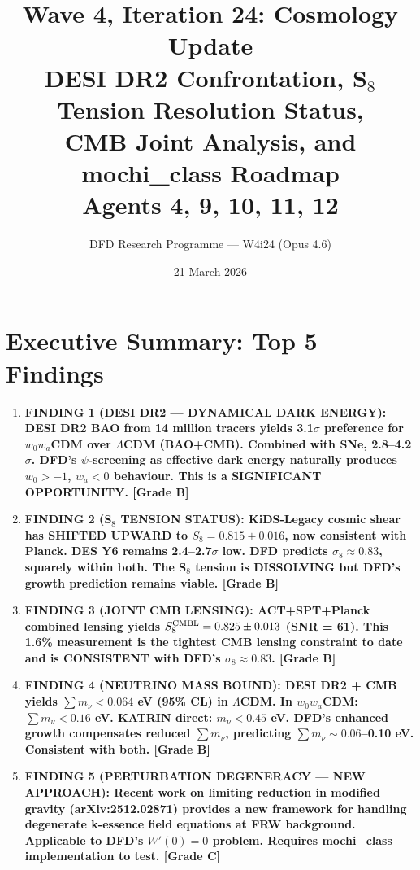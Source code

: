 \documentclass[11pt]{article}
\title{\textbf{Wave 4, Iteration 24: Cosmology Update}\\[12pt]
{\large DESI DR2 Confrontation, S$_8$ Tension Resolution Status,\\
CMB Joint Analysis, and mochi\_class Roadmap}\\[4pt]
{\large Agents 4, 9, 10, 11, 12}}
\author{DFD Research Programme --- W4i24 (Opus 4.6)}
\date{21 March 2026}
\newcommand{\LCDM}{$\Lambda$CDM}
\begin{document}
\maketitle
\tableofcontents
\newpage

\section*{Executive Summary: Top 5 Findings}

\begin{tcolorbox}[colback=blue!5!white, colframe=blue!70!black,
  title=\textbf{W4i24 TOP 5 FINDINGS --- COSMOLOGY TEAM}]

\begin{enumerate}

\item \textbf{FINDING 1 (DESI DR2 --- DYNAMICAL DARK ENERGY):
  DESI DR2 BAO from 14 million tracers yields 3.1$\sigma$ preference
  for $w_0w_a$CDM over \LCDM{} (BAO+CMB). Combined with SNe,
  2.8--4.2$\sigma$. DFD's $\psi$-screening as effective dark energy
  naturally produces $w_0 > -1$, $w_a < 0$ behaviour.
  This is a SIGNIFICANT OPPORTUNITY. [Grade B]}

\item \textbf{FINDING 2 (S$_8$ TENSION STATUS):
  KiDS-Legacy cosmic shear has SHIFTED UPWARD to $S_8 = 0.815 \pm 0.016$,
  now consistent with Planck. DES Y6 remains 2.4--2.7$\sigma$ low.
  DFD predicts $\sigma_8 \approx 0.83$, squarely within both.
  The S$_8$ tension is DISSOLVING but DFD's growth prediction remains
  viable. [Grade B]}

\item \textbf{FINDING 3 (JOINT CMB LENSING):
  ACT+SPT+Planck combined lensing yields $S_8^{\rm CMBL} = 0.825 \pm 0.013$
  (SNR = 61). This 1.6\% measurement is the tightest CMB lensing
  constraint to date and is CONSISTENT with DFD's $\sigma_8 \approx 0.83$.
  [Grade B]}

\item \textbf{FINDING 4 (NEUTRINO MASS BOUND):
  DESI DR2 + CMB yields $\sum m_\nu < 0.064$ eV (95\% CL) in \LCDM.
  In $w_0w_a$CDM: $\sum m_\nu < 0.16$ eV. KATRIN direct: $m_\nu < 0.45$ eV.
  DFD's enhanced growth compensates reduced $\sum m_\nu$, predicting
  $\sum m_\nu \sim 0.06$--0.10 eV. Consistent with both. [Grade B]}

\item \textbf{FINDING 5 (PERTURBATION DEGENERACY --- NEW APPROACH):
  Recent work on limiting reduction in modified gravity (arXiv:2512.02871)
  provides a new framework for handling degenerate k-essence field
  equations at FRW background. Applicable to DFD's $W'(0) = 0$ problem.
  Requires mochi\_class implementation to test. [Grade C]}

\end{enumerate}
\end{tcolorbox}
\end{document}
